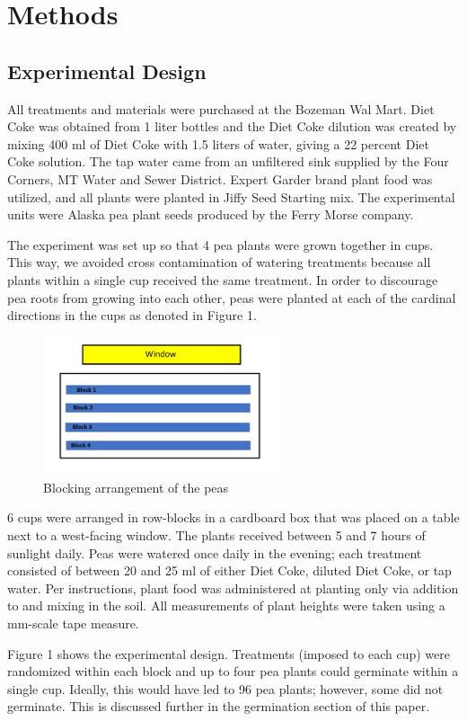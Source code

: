 \documentclass[1p,12pt]{elsarticle}\usepackage[]{graphicx}\usepackage[]{color}
\begin{document}
\section{Methods}
\subsection{Experimental Design}

All treatments and materials were purchased at the Bozeman Wal Mart. Diet Coke was obtained from 1 liter bottles and the Diet Coke dilution was created by mixing 400 ml of Diet Coke with 1.5 liters of water, giving a 22 percent Diet Coke solution. The tap water came from an unfiltered sink supplied by the Four Corners, MT Water and Sewer District. Expert Garder brand plant food was utilized, and all plants were planted in Jiffy Seed Starting mix.  The experimental units were Alaska pea plant seeds produced by the Ferry Morse company. 

The experiment was set up so that 4 pea plants were grown together in cups. This way, we avoided cross contamination of watering treatments because all plants within a single cup received the same treatment.  In order to discourage pea roots from growing into each other, peas were planted at each of the cardinal directions in the cups as denoted in Figure 1. 
 \begin{figure}[h!]
 	\caption{Blocking arrangement of the peas}
 	\centering
	\includegraphics[width = 7cm]{blocks.png}
\end{figure}


6 cups were arranged in row-blocks in a cardboard box that was placed on a table next to a west-facing window. The plants received between 5 and 7 hours of sunlight daily.  Peas were watered once daily in the evening; each treatment consisted of between 20 and 25 ml of either Diet Coke, diluted Diet Coke, or tap water. Per instructions, plant food was administered at planting only via addition to and mixing in the soil.  All measurements of plant heights were taken using a mm-scale tape measure. 

Figure 1 shows the experimental design. Treatments (imposed to each cup) were randomized within each block and up to four pea plants could germinate within a single cup. Ideally, this would have led to 96 pea plants; however, some did not germinate. This is discussed further in the germination section of this paper. 
\end{document}
